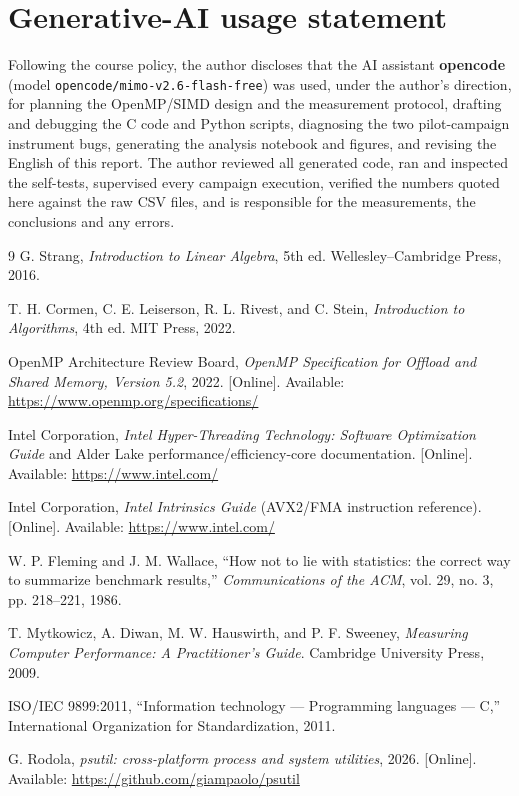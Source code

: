 \documentclass[11pt,a4paper]{article}
\begin{document}
\section*{Generative-AI usage statement}

Following the course policy, the author discloses that the AI assistant
\textbf{opencode} (model \texttt{opencode/mimo-v2.6-flash-free}) was used,
under the author's direction, for planning the OpenMP/SIMD design and the
measurement protocol, drafting and debugging the C code and Python scripts,
diagnosing the two pilot-campaign instrument bugs, generating the analysis
notebook and figures, and revising the English of this report. The author
reviewed all generated code, ran and inspected the self-tests, supervised
every campaign execution, verified the numbers quoted here against the raw
CSV files, and is responsible for the measurements, the conclusions and any
errors.

\begin{thebibliography}{9}
G. Strang, \emph{Introduction to Linear Algebra}, 5th ed.
Wellesley--Cambridge Press, 2016.

T. H. Cormen, C. E. Leiserson, R. L. Rivest, and C. Stein,
\emph{Introduction to Algorithms}, 4th ed. MIT Press, 2022.

OpenMP Architecture Review Board, \emph{OpenMP Specification for Offload and
Shared Memory, Version 5.2}, 2022. [Online]. Available:
\url{https://www.openmp.org/specifications/}

Intel Corporation, \emph{Intel Hyper-Threading Technology: Software
Optimization Guide} and Alder Lake performance/efficiency-core
documentation. [Online]. Available: \url{https://www.intel.com/}

Intel Corporation, \emph{Intel Intrinsics Guide} (AVX2/FMA instruction
reference). [Online]. Available: \url{https://www.intel.com/}

W. P. Fleming and J. M. Wallace, ``How not to lie with statistics: the correct
way to summarize benchmark results,'' \emph{Communications of the ACM},
vol. 29, no. 3, pp. 218--221, 1986.

T. Mytkowicz, A. Diwan, M. W. Hauswirth, and P. F. Sweeney,
\emph{Measuring Computer Performance: A Practitioner's Guide}.
Cambridge University Press, 2009.

ISO/IEC 9899:2011, ``Information technology --- Programming languages --- C,''
International Organization for Standardization, 2011.

G. Rodola, \emph{psutil: cross-platform process and system utilities}, 2026.
[Online]. Available: \url{https://github.com/giampaolo/psutil}
\end{thebibliography}
\end{document}
